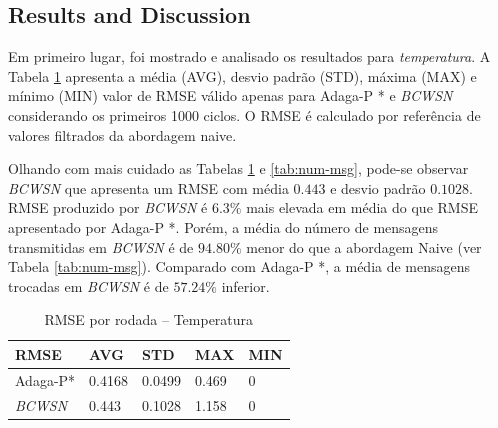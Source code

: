 \documentclass{acm_proc_article-sp}
\begin{document}
\subsection{Results and Discussion}
\label{results-and-discussion}

Em primeiro lugar, foi mostrado e analisado os resultados para
{\it temperatura}. A Tabela \ref{tab:rmse} apresenta a média (AVG), desvio
padrão (STD), máxima (MAX) e mínimo (MIN) valor de RMSE válido apenas para
Adaga-P * e {\it BCWSN} considerando os primeiros 1000 ciclos. O RMSE é calculado 
por referência de valores filtrados da abordagem naive.
\vspace*{-.3cm}

Olhando com mais cuidado as Tabelas \ref{tab:rmse} e \ref{tab:num-msg},
pode-se observar {\it BCWSN} que apresenta um RMSE com média $0.443$ e desvio padrão 
$0.1028$. RMSE produzido por {\it BCWSN} é $6.3\%$ mais elevada em média do 
que RMSE apresentado por Adaga-P *. Porém, a média do número de mensagens
transmitidas em {\it BCWSN} é de $94.80\%$ menor do que a abordagem Naive 
(ver Tabela  \ref{tab:num-msg}). Comparado com Adaga-P *, a média de mensagens
trocadas em {\it BCWSN} é de $57.24\%$ inferior.
\vspace*{-.3cm}

\begin{table}[h!]
\small
\caption{RMSE por rodada – Temperatura}
\label{tab:rmse}
\begin{center}
\begin{tabular}{|l||l|l|l|l|}
\hline
RMSE &AVG &STD &MAX &MIN \\
\hline\hline
Adaga-P* &0.4168 &0.0499 &0.469 &0 \\
\hline
{\it BCWSN} &0.443 &0.1028 &1.158 &0 \\
\hline
\end{tabular}
\end{center}
\end{table}
\vspace*{-.3cm}
\end{document}
